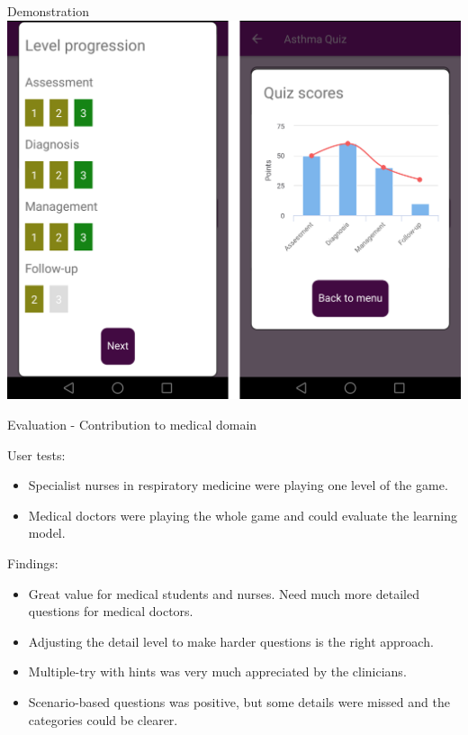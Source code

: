 \documentclass{beamer}
\begin{document}
\begin{frame}{Demonstration}
\includegraphics[scale=0.16]{Montage6}
\end{frame}

\begin{frame}{Evaluation - Contribution to medical domain}
\begin{block}{User tests:}
	\begin{itemize}
		\item Specialist nurses in respiratory medicine were playing one level of the game.
		\item Medical doctors were playing the whole game and could evaluate the learning model.
	\end{itemize}
\end{block}
\begin{block}{Findings:}
	\begin{itemize}
		\item Great value for medical students and nurses. Need much more detailed questions for medical doctors.
		\item Adjusting the detail level to make harder questions is the right approach.
		\item Multiple-try with hints was very much appreciated by the clinicians.
		\item Scenario-based questions was positive, but some details were missed and the categories could be clearer.
	\end{itemize}
\end{block}
\end{frame}
\end{document}

